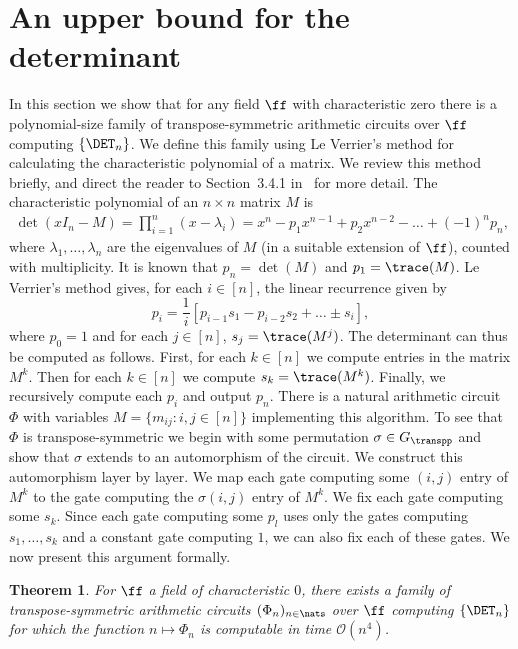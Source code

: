 \documentclass[11pt]{article}
\newtheorem{theorem}{Theorem}[section]
\begin{document}
\section{An upper bound for the determinant}  %
\label{sec:determinant}
In this section we show that for any field $\ff$ with characteristic zero there
is a polynomial-size family of transpose-symmetric arithmetic circuits over $\ff$
computing $\{\DET_n\}$. We define this family using Le Verrier's method for
calculating the characteristic polynomial of a matrix. We review this method
briefly, and direct the reader to Section~3.4.1 in~\cite{Holm10} for more
detail.
The characteristic polynomial of an $n \times n$ matrix $M$ is
\begin{align*}
  \det(x I_n - M) = \prod^n_{i = 1} (x - \lambda_i) =
   x^n - p_1x^{n-1} + p_2 x^{n -2} - \ldots + (-1)^{n}p_n,
\end{align*}
where $\lambda_1, \ldots , \lambda_n$ are the eigenvalues of $M$ (in a suitable extension of $\ff$), counted with multiplicity.
%
%
%
It is known that $p_n = \det (M)$ and $p_1 = \trace(M)$. Le
Verrier's method gives, for each $i \in [n]$, the linear recurrence given by
$$p_i = \frac{1}{i} [p_{i -1} s_1 - p_{i -2} s_2 + \ldots \pm s_i],$$
where $p_0 = 1$ and for each $j \in [n]$, $s_j = \trace(M^j)$.
The determinant can thus be computed as follows. First, for each $k \in [n]$ we
compute entries in the matrix $M^k$. Then for each $k \in [n]$ we compute $s_k =
\trace(M^k)$. Finally, we recursively compute each $p_i$ and output $p_n$. There
is a natural arithmetic circuit $\Phi$ with variables $M = \{m_{ij} : i, j \in
[n]\}$ implementing this algorithm.
To see that $\Phi$ is transpose-symmetric we begin with some permutation $\sigma
\in G_{\transpp}$ and show that $\sigma$ extends to an automorphism of the
circuit. We construct this automorphism layer by layer. We map each gate
computing some $(i, j)$ entry of $M^k$ to the gate computing the $\sigma (i, j)$
entry of $M^k$. We fix each gate computing some $s_k$. Since each gate computing
some $p_l$ uses only the gates computing $s_1, \ldots, s_k$ and a constant gate
computing $1$, we can also fix each of these gates. We now present this argument
formally.
\begin{theorem}
  For $\ff$ %
  a field of characteristic $0$, there exists a family of transpose-symmetric
  arithmetic circuits $(\Phi_n)_{n \in \nats}$ over $\ff$ computing
  $\{\DET_n\}$ for which the function $n \mapsto \Phi_n$ is computable in time
  $\mathcal{O}(n^4)$.
  \label{thm:det-upper-bound}
\end{theorem}
\end{document}
